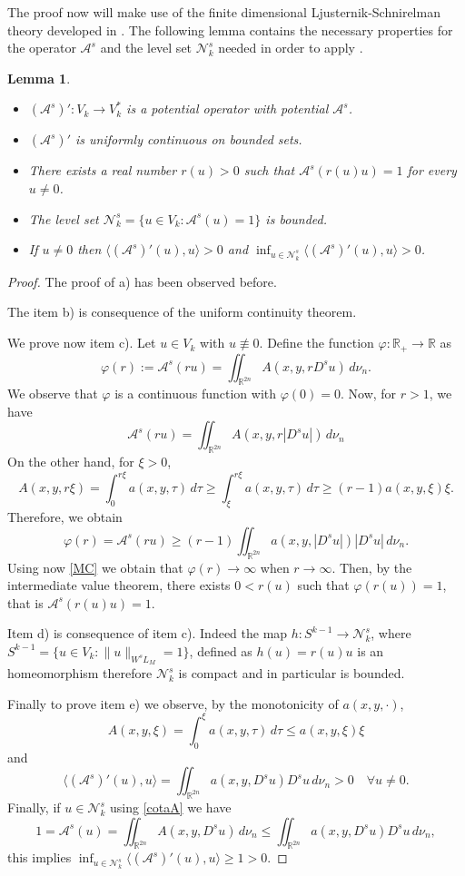 \documentclass{amsart}
\newcommand{\R}{{\mathbb R}}
\newcommand{\EE}{{\mathcal A}^s}
\newtheorem{lema}[teo]{Lemma}
\theoremstyle{remark}
\theoremstyle{definition}
\numberwithin{equation}{section}
\begin{document}
The proof now will make use of the finite dimensional Ljusternik-Schnirelman theory developed in \cite{Zei80}. The following lemma contains the necessary properties for the operator $\EE$ and the level set $\mathcal{N}_k^s$ needed in order to apply \cite[Theorem 2]{Zei80}.


\begin{lema}\label{PropEsa}
\begin{itemize}
\item[a)] $(\EE)'\colon V_k\to V_k^*$ is a potential operator with potential $\EE$.
\item[b)] $(\EE)'$ is uniformly continuous on bounded sets.
\item[c)] There exists a real number $r(u)>0$ such that $\EE(r(u)u)=1$ for every $u\neq 0$.
\item[d)] The level set $\mathcal{N}_k^s=\{u\in V_k\colon \EE(u)=1\}$ is bounded.
\item[e)] If $u\neq 0$ then  $\langle (\EE)'(u),u \rangle>0$ and  $\inf_{u\in \mathcal{N}_k^s}\langle (\EE)'(u),u \rangle>0$.  
\end{itemize}	
\end{lema}
\begin{proof}
The proof of a) has been observed before.

The item b) is consequence of the uniform continuity theorem.

We prove now item c). Let $u\in V_k$ with $u\not\equiv 0$. Define the function $\varphi\colon \R_+\to \R$ as
$$
\varphi(r):=\EE(ru)=\iint_{\R^{2n}}A(x, y, rD^su)\, d\nu_n.
$$	
We observe that $\varphi$ is a continuous function with $\varphi(0)=0$. Now, for $r>1$, we have
$$
\EE(ru)=\iint_{\R^{2n}} A(x,y,r |D^s u|)\, d\nu_n
$$
On the other hand, for $\xi>0$,
$$
A(x, y, r\xi) = \int_0^{r\xi} a(x, y, \tau)\, d\tau \ge \int_{\xi}^{r\xi} a(x, y, \tau)\, d\tau\ge (r-1)a(x, y, \xi)\xi.
$$
Therefore, we obtain
$$
\varphi(r)=\EE(ru)\ge (r-1)\iint_{\R^{2n}}a(x, y, |D^s u|)|D^s u|\, d\nu_n.
$$
Using now \eqref{MC} we obtain that $\varphi(r)\to\infty$ when $r\to\infty$. Then, by the intermediate value theorem, there exists $0<r(u)$ such that $\varphi(r(u))=1$, that is $\EE(r(u)u)=1$.

Item d) is consequence of item c). Indeed the map $h\colon S^{k-1} \to \mathcal{N}_k^s$, where $S^{k-1}=\{u\in V_k\colon \|u\|_{W^sL_M}=1\}$, defined as $h(u)=r(u)u$ is an homeomorphism therefore $\mathcal{N}_k^s$ is compact and in particular is bounded.

Finally to prove item e) we observe, by the monotonicity of $a(x,y,\cdot)$, 
\begin{equation}\label{cotaA}
A(x, y, \xi) = \int_0^{\xi} a(x, y, \tau)\, d\tau \le a(x, y, \xi)\xi
\end{equation}
and
$$
\langle (\EE)'(u),u \rangle=\iint_{\R^{2n}} a(x,y,D^su)D^s u\,d\nu_n >0 \quad \forall u\neq 0.
$$
Finally, if $u \in \mathcal{N}_k^s$ using \eqref{cotaA} we have
$$
1=\EE(u)=\iint_{\R^{2n}}A(x,y,D^s u)\, d\nu_n \leq \iint_{\R^{2n}}a(x,y,D^su)D^su\,d\nu_n,
$$
this implies $\inf_{u\in \mathcal{N}_k^s}\langle (\EE)'(u),u \rangle\ge 1>0$.  
\end{proof}
\end{document}
